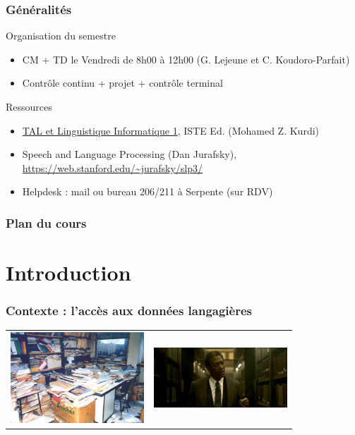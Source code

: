 \begin{frame}
  \frametitle{Généralités}
  \begin{block}{Organisation du semestre}
 \begin{itemize}
   \item CM + TD le Vendredi de 8h00 à 12h00 (G. Lejeune et C. Koudoro-Parfait)
   \item Contrôle continu + projet + contrôle terminal
  
  \end{itemize}
  \end{block}
\begin{block}{Ressources}
  \begin{itemize}
  \item \href{http://paris-sorbonne.hosted.exlibrisgroup.com/F?func=find-c&ccl_term=idn=ppn199563403&local_base=MAH01}{TAL et Linguistique Informatique 1}, ISTE Ed. (Mohamed Z. Kurdi) 
  \item Speech and Language Processing (Dan Jurafsky), \url{https://web.stanford.edu/~jurafsky/slp3/} 
  \item Helpdesk : mail ou bureau 206/211 à Serpente (sur RDV)
  \end{itemize}
   \end{block}
\end{frame}

\begin{frame}
  \frametitle{Plan du cours}
\tableofcontents

\end{frame}
\section{Introduction}


\begin{frame}
  \frametitle{Contexte : l'accès aux données langagières}
  \begin{block}{}
    \begin{tabular}{cc}
      \includegraphics[width=5cm]{images/bordel.png} & \includegraphics[width=5cm]{images/seven_library.png}\\
    \end{tabular}
  \end{block}
\end{frame}


